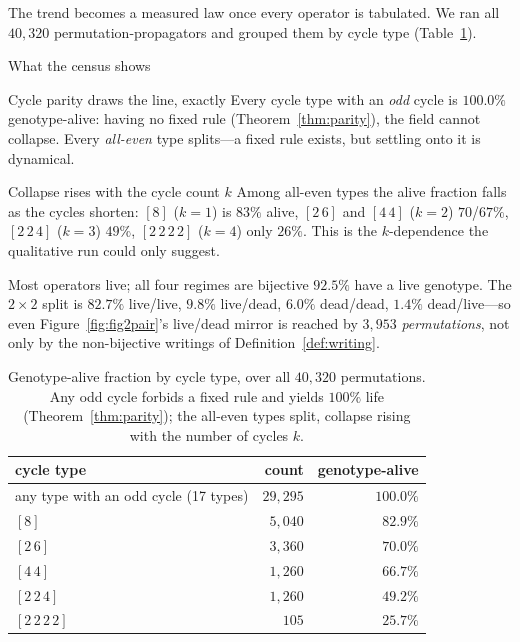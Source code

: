 \documentclass[man,12pt,floatsintext]{apa7}
\begin{document}
The trend becomes a measured law once every operator is tabulated. We ran all
$40{,}320$ permutation-propagators and grouped them by cycle type
(Table~\ref{tab:census}).

\begin{expositionbox}{What the census shows}
\begin{pointbox}{Cycle parity draws the line, exactly}
Every cycle type with an \emph{odd} cycle is $100.0\%$ genotype-alive: having no
fixed rule (Theorem~\ref{thm:parity}), the field cannot collapse. Every
\emph{all-even} type splits---a fixed rule exists, but settling onto it is
dynamical.
\end{pointbox}
\begin{pointbox}{Collapse rises with the cycle count $k$}
Among all-even types the alive fraction falls as the cycles shorten: $[8]$
($k{=}1$) is $83\%$ alive, $[2\,6]$ and $[4\,4]$ ($k{=}2$) $70$/$67\%$, $[2\,2\,4]$
($k{=}3$) $49\%$, $[2\,2\,2\,2]$ ($k{=}4$) only $26\%$. This is the
$k$-dependence the qualitative run could only suggest.
\end{pointbox}
\begin{pointbox}{Most operators live; all four regimes are bijective}
$92.5\%$ have a live genotype. The $2\times2$ split is $82.7\%$ live/live,
$9.8\%$ live/dead, $6.0\%$ dead/dead, $1.4\%$ dead/live---so even
Figure~\ref{fig:fig2pair}'s live/dead mirror is reached by $3{,}953$
\emph{permutations}, not only by the
non-bijective writings of Definition~\ref{def:writing}.
\end{pointbox}
\end{expositionbox}

\begin{table}[t]
\centering\small
\caption{Genotype-alive fraction by cycle type, over all $40{,}320$
permutations. Any odd cycle forbids a fixed rule and yields $100\%$ life
(Theorem~\ref{thm:parity}); the all-even types split, collapse rising with the
number of cycles $k$.}
\label{tab:census}
\begin{tabular}{lrr}
\toprule
cycle type & count & genotype-alive \\
\midrule
any type with an odd cycle (17 types) & $29{,}295$ & $100.0\%$ \\
$[8]$        & $5{,}040$ & $82.9\%$ \\
$[2\,6]$     & $3{,}360$ & $70.0\%$ \\
$[4\,4]$     & $1{,}260$ & $66.7\%$ \\
$[2\,2\,4]$  & $1{,}260$ & $49.2\%$ \\
$[2\,2\,2\,2]$ & $105$   & $25.7\%$ \\
\bottomrule
\end{tabular}
\end{table}
\end{document}
